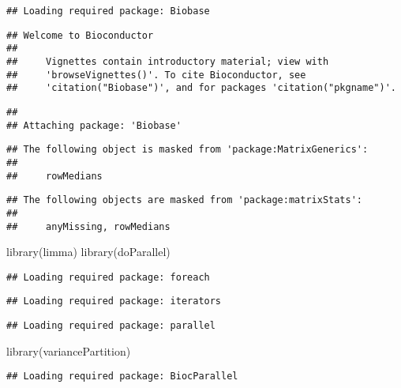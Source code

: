 \documentclass[
]{article}
\newenvironment{Shaded}{\begin{snugshade}}{\end{snugshade}}
\newcommand{\FunctionTok}[1]{\textcolor[rgb]{0.00,0.00,0.00}{#1}}
\newcommand{\NormalTok}[1]{#1}
\begin{document}
\begin{verbatim}
## Loading required package: Biobase
\end{verbatim}

\begin{verbatim}
## Welcome to Bioconductor
## 
##     Vignettes contain introductory material; view with
##     'browseVignettes()'. To cite Bioconductor, see
##     'citation("Biobase")', and for packages 'citation("pkgname")'.
\end{verbatim}

\begin{verbatim}
## 
## Attaching package: 'Biobase'
\end{verbatim}

\begin{verbatim}
## The following object is masked from 'package:MatrixGenerics':
## 
##     rowMedians
\end{verbatim}

\begin{verbatim}
## The following objects are masked from 'package:matrixStats':
## 
##     anyMissing, rowMedians
\end{verbatim}

\begin{Shaded}
\begin{Highlighting}[]
\FunctionTok{library}\NormalTok{(limma)}
\FunctionTok{library}\NormalTok{(doParallel)}
\end{Highlighting}
\end{Shaded}

\begin{verbatim}
## Loading required package: foreach
\end{verbatim}

\begin{verbatim}
## Loading required package: iterators
\end{verbatim}

\begin{verbatim}
## Loading required package: parallel
\end{verbatim}

\begin{Shaded}
\begin{Highlighting}[]
\FunctionTok{library}\NormalTok{(variancePartition)}
\end{Highlighting}
\end{Shaded}

\begin{verbatim}
## Loading required package: BiocParallel
\end{verbatim}
\end{document}
